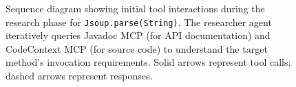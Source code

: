 \begin{figure}[htbp]
\centering

\caption{Sequence diagram showing initial tool interactions during the research phase for \texttt{Jsoup.parse(String)}. The researcher agent iteratively queries Javadoc MCP (for API documentation) and CodeContext MCP (for source code) to understand the target method's invocation requirements. Solid arrows represent tool calls; dashed arrows represent responses.}
\label{fig:research-sequence}
\end{figure}